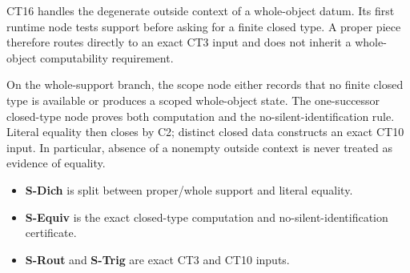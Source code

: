 \documentclass[
  11pt,
]{article}
\providecommand{\tightlist}{%
  \setlength{\itemsep}{0pt}\setlength{\parskip}{0pt}}
\theoremstyle{definition}
\begin{document}
CT16 handles the degenerate outside context of a whole-object datum.  Its
first runtime node tests support before asking for a finite closed type.  A
proper piece therefore routes directly to an exact CT3 input and does not
inherit a whole-object computability requirement.

On the whole-support branch, the scope node either records that no finite
closed type is available or produces a scoped whole-object state.  The
one-successor closed-type node proves both computation and the
no-silent-identification rule.  Literal equality then closes by C2; distinct
closed data constructs an exact CT10 input.  In particular, absence of a
nonempty outside context is never treated as evidence of equality.

\begin{itemize}
\tightlist
\item \textbf{S-Dich} is split between proper/whole support and literal equality.
\item \textbf{S-Equiv} is the exact closed-type computation and no-silent-identification certificate.
\item \textbf{S-Rout} and \textbf{S-Trig} are exact CT3 and CT10 inputs.
\end{itemize}
\end{document}
